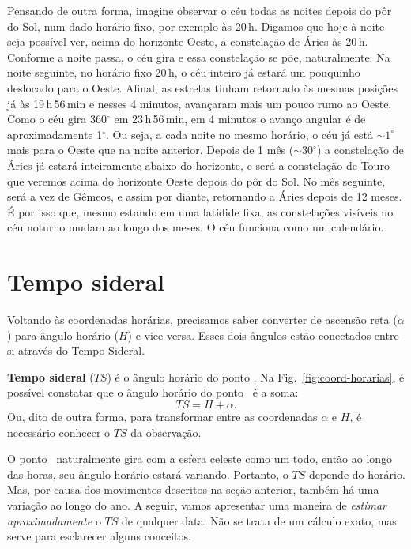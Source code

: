 Pensando de outra forma, imagine observar o céu todas as noites depois do pôr do Sol, num dado horário fixo, por exemplo às 20\,h. Digamos que hoje à noite seja possível ver, acima do horizonte Oeste, a constelação de Áries às 20\,h. Conforme a noite passa, o céu gira e essa constelação se põe, naturalmente. Na noite seguinte, no horário fixo 20\,h, o céu inteiro já estará um pouquinho deslocado para o Oeste. Afinal, as estrelas tinham retornado às mesmas posições já às 19\,h\,56\,min e nesses 4 minutos, avançaram mais um pouco rumo ao Oeste. Como o céu gira 360$^{\circ}$ em 23\,h\,56\,min, em 4 minutos o avanço angular é de aproximadamente 1$^{\circ}$. Ou seja, a cada noite no mesmo horário, o céu já está ${\sim}1^{\circ}$ mais para o Oeste que na noite anterior. Depois de 1 mês (${\sim}30^{\circ}$) a constelação de Áries já estará inteiramente abaixo do horizonte, e será a constelação de Touro que veremos acima do horizonte Oeste depois do pôr do Sol. No mês seguinte, será a vez de Gêmeos, e assim por diante, retornando a Áries depois de 12 meses. É por isso que, mesmo estando em uma latidide fixa, as constelações visíveis no céu noturno mudam ao longo dos meses. O céu funciona como um calendário.

\section{Tempo sideral}
\label{sec:ts}

Voltando às coordenadas horárias, precisamos saber converter de ascensão reta ($\alpha$) para ângulo horário ($H$) e vice-versa. Esses dois ângulos estão conectados entre si através do Tempo Sideral.

\textbf{Tempo sideral} ($TS$) é o ângulo horário do ponto \Aries. Na Fig.~\ref{fig:coord-horarias}, é possível constatar que o ângulo horário do ponto \Aries\ é a soma:
%
\begin{equation}
TS = H + \alpha.
\end{equation}
%
Ou, dito de outra forma, para transformar entre as coordenadas $\alpha$ e $H$, é necessário conhecer o $TS$ da observação.

O ponto \Aries\ naturalmente gira com a esfera celeste como um todo, então ao longo das horas, seu ângulo horário estará variando. Portanto, o $TS$ depende do horário. Mas, por causa dos movimentos descritos na seção anterior, também há uma variação ao longo do ano. A seguir, vamos apresentar uma maneira de \textit{estimar aproximadamente} o $TS$ de qualquer data. Não se trata de um cálculo exato, mas serve para esclarecer alguns conceitos.

